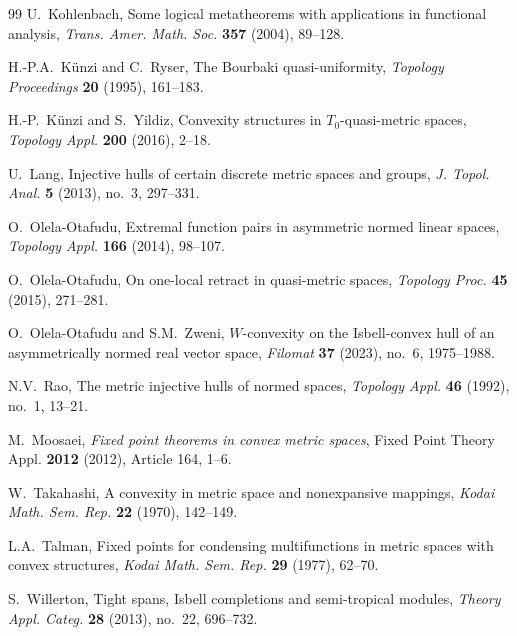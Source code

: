 \documentclass[preprint,12pt]{elsarticle}
\numberwithin{equation}{section}
\begin{document}
\begin{thebibliography}{99}
U.~Kohlenbach,
Some logical metatheorems with applications in functional analysis,
\emph{Trans. Amer. Math. Soc.} \textbf{357} (2004), 89--128.

H.-P.A.~K\"unzi and C.~Ryser,
The Bourbaki quasi-uniformity,
\emph{Topology Proceedings} \textbf{20} (1995), 161--183.

H.-P.~K\"unzi and S.~Yildiz,
Convexity structures in $T_0$-quasi-metric spaces,
\emph{Topology Appl.} \textbf{200} (2016), 2--18.

U.~Lang,
Injective hulls of certain discrete metric spaces and groups,
\emph{J. Topol. Anal.} \textbf{5} (2013), no.~3, 297--331.

O.~Olela-Otafudu,
Extremal function pairs in asymmetric normed linear spaces,
\emph{Topology Appl.} \textbf{166} (2014), 98--107.

O.~Olela-Otafudu,
On one-local retract in quasi-metric spaces,
\emph{Topology Proc.} \textbf{45} (2015), 271--281.

O.~Olela-Otafudu and S.M.~Zweni,
$W$-convexity on the Isbell-convex hull of an asymmetrically normed real vector space,
\emph{Filomat} \textbf{37} (2023), no.~6, 1975--1988.

N.V.~Rao,
The metric injective hulls of normed spaces,
\emph{Topology Appl.} \textbf{46} (1992), no.~1, 13--21.

M.~Moosaei,
\emph{Fixed point theorems in convex metric spaces},
Fixed Point Theory Appl. \textbf{2012} (2012), Article 164, 1--6.


W.~Takahashi,
A convexity in metric space and nonexpansive mappings,
\emph{Kodai Math. Sem. Rep.} \textbf{22} (1970), 142--149.

L.A.~Talman,
Fixed points for condensing multifunctions in metric spaces with convex structures,
\emph{Kodai Math. Sem. Rep.} \textbf{29} (1977), 62--70.

S.~Willerton,
Tight spans, Isbell completions and semi-tropical modules,
\emph{Theory Appl. Categ.} \textbf{28} (2013), no.~22, 696--732.

\end{thebibliography}
\end{document}
